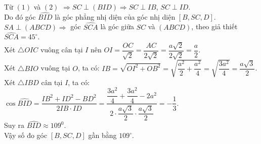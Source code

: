 \begin{ex}
{\begin{itemchoice}
   Từ $(1)$ và $(2)$ $\Rightarrow SC\perp(BID) \Rightarrow SC\perp IB$, $SC\perp ID$. \\ 
   Do đó góc $\widehat{BID}$ là góc phẳng nhị diện của góc nhị diện $[B,  SC, D]$.\\
   $SA\perp(ABCD) \Rightarrow$ góc $\widehat{SCA}$ là góc giữa $SC$ và $(ABCD)$,  theo giả thiết $\widehat{SCA}=45^{\circ}$.\\
    Xét $\triangle OIC$ vuông cân tại $I$ nên $OI=\dfrac{OC}{\sqrt{2}}=\dfrac{AC}{2\sqrt{2}}=\dfrac{a \sqrt{2}}{2\sqrt{2}}=\dfrac{a}{2}$.\\
   Xét $\triangle BIO$ vuông tại $O$, ta có: $IB=\sqrt{OI^2+OB^2}=\sqrt{\dfrac{a^2}{2}+\dfrac{a^2}{4}}=\sqrt{\dfrac{3a^2}{4}}=\dfrac{a  \sqrt{3}}{2}$.\\
   Xét $\triangle IBD$ cân  tại $I$, ta có: $\cos \widehat{BID}=\dfrac{IB^2+ID^2-BD^2}{2IB\cdot ID}=\dfrac{\dfrac{3a^2}{4}+\dfrac{3a^2}{4}-2a^2}{2\cdot \dfrac{a \sqrt{3}}{2} \cdot \dfrac{a \sqrt{3}}{2}}=-\dfrac{1}{3}$.\\
   Suy ra $\widehat{BID} \approx  109^0$.\\
   Vậy số đo  góc $[B, SC, D]$ gần bằng $109^{\circ}$.
  \end{itemchoice}
 } 
\end{ex}

